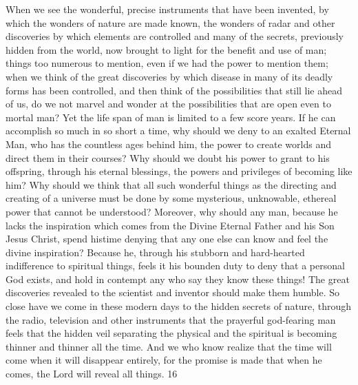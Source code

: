 When we see the wonderful, precise instruments that have been invented, by which the
wonders of nature are made known, the wonders of radar and other discoveries by which
elements are controlled and many of the secrets, previously hidden from the world, now
brought to light for the benefit and use of man; things too numerous to mention, even if we
had the power to mention them; when we think of the great discoveries by which disease in
many of its deadly forms has been controlled, and then think of the possibilities that still lie
ahead of us, do we not marvel and wonder at the possibilities that are open even to mortal
man? Yet the life span of man is limited to a few score years. If he can accomplish so much
in so short a time, why should we deny to an exalted Eternal Man, who has the countless ages
behind him, the power to create worlds and direct them in their courses? Why should we
doubt his power to grant to his offspring, through his eternal blessings, the powers and
privileges of becoming like him? Why should we think that all such wonderful things as the
directing and creating of a universe must be done by some mysterious, unknowable, ethereal
power that cannot be understood? Moreover, why should any man, because he lacks the
inspiration which comes from the Divine Eternal Father and his Son Jesus Christ, spend histime denying that any one else can know and feel the divine inspiration? Because he, through
his stubborn and hard-hearted indifference to spiritual things, feels it his bounden duty to
deny that a personal God exists, and hold in contempt any who say they know these things!
The great discoveries revealed to the scientist and inventor should make them humble. So
close have we come in these modern days to the hidden secrets of nature, through the radio,
television and other instruments that the prayerful god-fearing man feels that the hidden veil
separating the physical and the spiritual is becoming thinner and thinner all the time. And we
who know realize that the time will come when it will disappear entirely, for the promise is
made that when he comes, the Lord will reveal all things. 16

